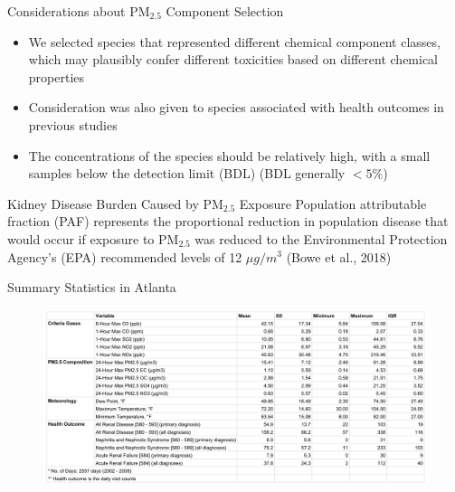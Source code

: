 \documentclass[handout]{beamer} %
\begin{document}
\begin{frame}{Considerations about PM$_{2.5}$ Component Selection}
    \begin{itemize}
        \item We selected species that represented different chemical component classes, which may plausibly confer different toxicities based on different chemical properties
        \item Consideration was also given to species associated with health outcomes in previous studies
        \item The concentrations of the species should be relatively high, with a small samples below the detection limit (BDL) (BDL generally $<5\%$)
    \end{itemize}
\end{frame}

\begin{frame}{Kidney Disease Burden Caused by PM$_{2.5}$ Exposure}
    Population attributable fraction (PAF) represents the proportional reduction in population disease that would occur if exposure to PM$_{2.5}$ was reduced to the Environmental Protection Agency's (EPA) recommended levels of 12 $\mu g/m^3$ (Bowe et al., 2018)
\end{frame}

\begin{frame}{Summary Statistics in Atlanta}
    \begin{figure}[H]
        \centering
        \includegraphics[width=\textwidth]{img/appendix/Aim3/table.jpg}
    \end{figure}
\end{frame}
\end{document}
